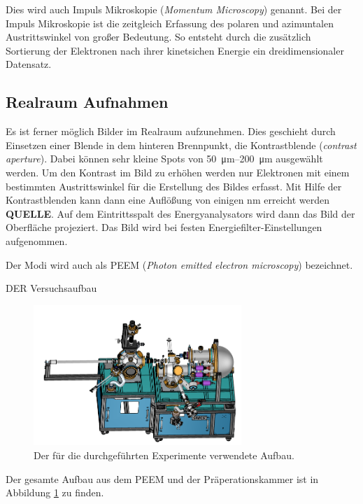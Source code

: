             Dies wird auch Impuls Mikroskopie (\textit{Momentum Microscopy}) genannt.
            Bei der Impuls Mikroskopie ist die zeitgleich Erfassung des polaren und azimuntalen Austrittswinkel von großer Bedeutung. 
            So entsteht durch die zusätzlich Sortierung der Elektronen nach ihrer kinetsichen Energie ein dreidimensionaler Datensatz.

        \subsection{Realraum Aufnahmen}
            Es ist ferner möglich Bilder im Realraum aufzunehmen.
            Dies geschieht durch Einsetzen einer Blende in dem hinteren Brennpunkt, die Kontrastblende (\textit{contrast aperture}).
            Dabei können sehr kleine Spots von \SIrange{50}{200}{\micro\meter} ausgewählt werden.
            Um den Kontrast im Bild zu erhöhen werden nur Elektronen mit einem bestimmten Austrittswinkel für die Erstellung des Bildes erfasst.
            Mit Hilfe der Kontrastblenden kann dann eine Auflößung von einigen \si{\nano\meter} erreicht werden \textbf{QUELLE}. 
            Auf dem Eintrittsspalt des Energyanalysators wird dann das Bild der Oberfläche projeziert.
            Das Bild wird bei festen Energiefilter-Einstellungen aufgenommen.

            Der Modi wird auch als PEEM (\textit{Photon emitted electron microscopy}) bezeichnet.

            DER Versuchsaufbau
            \begin{figure}
                \centering
                \includegraphics[width=0.7\textwidth]{./content/MM.png}
                \caption{Der für die durchgeführten Experimente verwendete Aufbau.}
                \label{fig:aufbau}
            \end{figure}
            Der gesamte Aufbau aus dem PEEM und der Präperationskammer ist in Abbildung \ref{fig:aufbau} zu finden.
        
